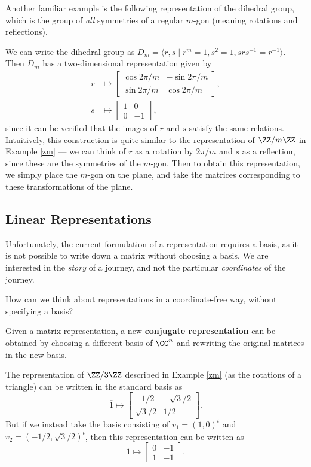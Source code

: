 Another familiar example is the following representation of the dihedral group, which is the group of \emph{all} symmetries of a regular $m$-gon (meaning rotations and reflections).
\begin{example}
We can write the dihedral group as $D_m = \langle r, s \mid r^m = 1, s^2 = 1, srs^{-1} = r^{-1} \rangle$. Then $D_m$ has a two-dimensional representation given by 
\begin{align*}
    r &\mapsto \begin{bmatrix}
    \cos 2\pi/m & -\sin 2\pi/m \\
    \sin 2\pi/m & \cos 2\pi/m
    \end{bmatrix},\\
    s &\mapsto \begin{bmatrix} 1 & 0 \\ 0 & -1\end{bmatrix},
\end{align*}
since it can be verified that the images of $r$ and $s$ satisfy the same relations. Intuitively, this construction is quite similar to the representation of $\ZZ/m\ZZ$ in Example \ref{zm} --- we can think of $r$ as a rotation by $2\pi/m$ and $s$ as a reflection, since these are the symmetries of the $m$-gon. Then to obtain this representation, we simply place the $m$-gon on the plane, and take the matrices corresponding to these transformations of the plane. 
\end{example}

\subsection{Linear Representations}

Unfortunately, the current formulation of a representation requires a basis, as it is not possible to write down a matrix without choosing a basis. We are interested in the \emph{story} of a journey, and not the particular \emph{coordinates} of the journey.

\begin{qq}
How can we think about representations in a coordinate-free way, without specifying a basis?
\end{qq}

Given a matrix representation, a new \textbf{conjugate representation} can be obtained by choosing a different basis of $\CC^n$ and rewriting the original matrices in the new basis. 

\begin{example}\label{z3}
The representation of $\ZZ/3\ZZ$ described in Example \ref{zm} (as the rotations of a triangle) can be written in the standard basis as \[\overline{1} \mapsto \begin{bmatrix}-1/2 & -\sqrt{3}/2 \\ \sqrt{3}/2 & 1/2\end{bmatrix}.\] But if we instead take the basis consisting of $v_1= (1, 0)^t$ and $v_2 = (-1/2, \sqrt{3}/2)^t$, then this representation can be written as \[\overline{1} \mapsto \begin{bmatrix}0 & -1 \\ 1 & -1\end{bmatrix}.\] 
\end{example}

